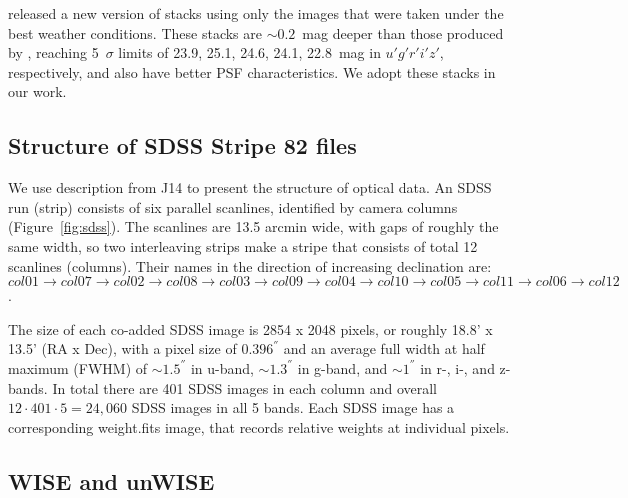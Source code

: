 \documentclass[numberedappendix,apj,twocolumn]{emulateapj}
\begin{document}
\citet[][hereafter J14]{Jiang2014} released a new version of stacks using only the images that were taken under the best weather conditions. These stacks are $\sim0.2$~mag deeper than those produced by \citet[][]{Annis2014}, reaching 5~$\sigma$ limits of 23.9, 25.1, 24.6, 24.1, 22.8~mag in $u' g' r' i' z'$, respectively, and also have better PSF characteristics. We adopt these stacks in our work.

\subsection{Structure of SDSS Stripe 82 files}

We use description from J14 to present the structure of optical data. An SDSS run (strip) consists of six parallel scanlines, identified by camera columns (Figure~\ref{fig:sdss}). The scanlines are 13.5 arcmin wide, with gaps of roughly the same width, so two interleaving strips make a stripe that consists of total 12 scanlines (columns). Their names in the direction of increasing declination are:
$col01 \rightarrow col07 \rightarrow col02 \rightarrow col08 \rightarrow col03 \rightarrow col09 \rightarrow col04 \rightarrow col10 \rightarrow col05 \rightarrow col11 \rightarrow col06 \rightarrow col12$.


The size of each co-added SDSS image is 2854 x 2048 pixels, or roughly 18.8' x 13.5' (RA x Dec), with a pixel size of $0.396^{''}$ and an average full width at half maximum (FWHM) of $\sim1.5^{''}$ in u-band, $\sim1.3^{''}$ in g-band, and $\sim1^{''}$ in r-, i-, and z-bands. In total there are 401 SDSS images in each column and overall $12 \cdot 401 \cdot 5 = 24,060$ SDSS images in all 5 bands. Each SDSS image has a corresponding weight.fits image, that records relative weights at individual pixels.

\subsection{WISE and unWISE}

\end{document}
